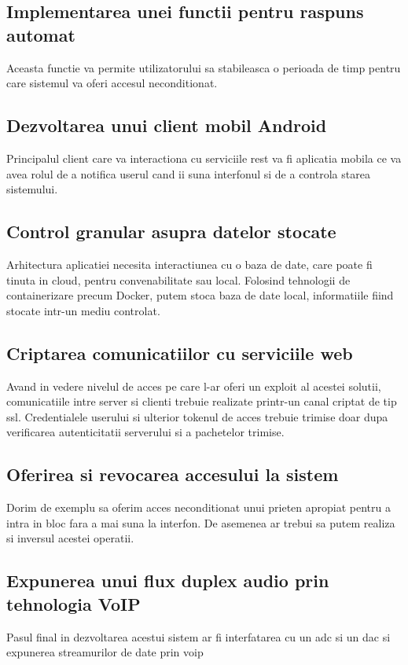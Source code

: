 \subsection{Implementarea unei functii pentru raspuns automat}

Aceasta functie va permite utilizatorului sa stabileasca o perioada de timp pentru care sistemul va oferi accesul neconditionat.

\subsection{Dezvoltarea unui client mobil Android}

Principalul client care va interactiona cu serviciile \acrshort{rest} va fi aplicatia mobila ce va avea rolul de a notifica userul cand ii suna interfonul si de a controla starea sistemului.

\subsection{Control granular asupra datelor stocate}

Arhitectura aplicatiei necesita interactiunea cu o baza de date, care poate fi tinuta in cloud, pentru convenabilitate sau local.
Folosind tehnologii de containerizare precum Docker, putem stoca baza de date local, informatiile fiind stocate intr-un mediu controlat.

\subsection{Criptarea comunicatiilor cu serviciile web}

Avand in vedere nivelul de acces pe care l-ar oferi un exploit al acestei solutii, comunicatiile intre server si clienti trebuie realizate printr-un canal criptat de tip \acrfull{ssl}. Credentialele userului si ulterior tokenul de acces trebuie trimise doar dupa verificarea autenticitatii serverului si a pachetelor trimise.

\subsection{Oferirea si revocarea accesului la sistem}

Dorim de exemplu sa oferim acces neconditionat unui prieten apropiat pentru a intra in bloc fara a mai suna la interfon. De asemenea ar trebui sa putem realiza si inversul acestei operatii.

\subsection{Expunerea unui flux duplex audio prin tehnologia VoIP}

Pasul final in dezvoltarea acestui sistem ar fi interfatarea cu un \acrfull{adc} si un \acrfull{dac} si expunerea streamurilor de date prin \acrfull{voip}
